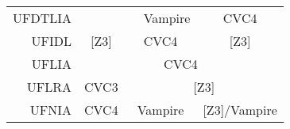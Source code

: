 \begin{table}
{\begin{tabular}{|rcccc|}
UFDTLIA                          & \multicolumn{1}{l}{}          & \multicolumn{1}{l|}{}               & \multicolumn{1}{c|}{Vampire}  & \multicolumn{1}{c|}{CVC4}             \\ \cline{2-5}
\multicolumn{1}{|r|}{UFIDL}      & \multicolumn{1}{c|}{{[}Z3{]}} & \multicolumn{2}{c|}{CVC4}                                           & \multicolumn{1}{c|}{{[}Z3{]}}         \\ \cline{2-5}
\multicolumn{1}{|r|}{UFLIA}      & \multicolumn{4}{c|}{CVC4}                                                                                                                   \\ \cline{2-5}
\multicolumn{1}{|r|}{UFLRA}      & \multicolumn{1}{c|}{CVC3}     & \multicolumn{3}{c|}{{[}Z3{]}}                                                                               \\ \cline{2-5}
\multicolumn{1}{|r|}{UFNIA}      & \multicolumn{1}{c|}{CVC4}     & \multicolumn{2}{c|}{Vampire}                                        & \multicolumn{1}{c|}{{[}Z3{]}/Vampire} \\ \hline
\end{tabular}}
\end{table}

